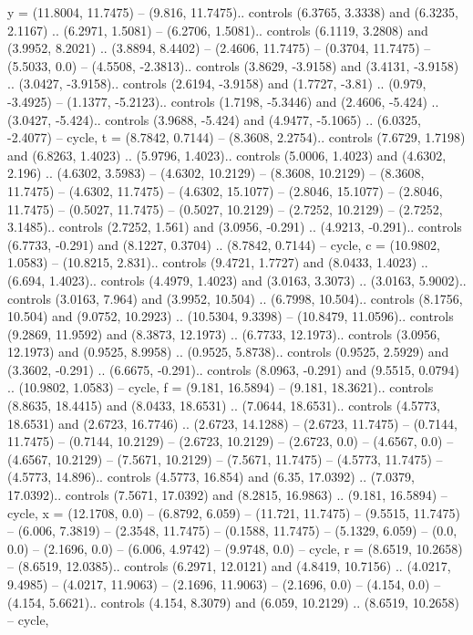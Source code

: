 {y} = {(11.8004, 11.7475) -- (9.816, 11.7475).. controls (6.3765, 3.3338) and (6.3235, 2.1167) .. (6.2971, 1.5081) -- (6.2706, 1.5081).. controls (6.1119, 3.2808) and (3.9952, 8.2021) .. (3.8894, 8.4402) -- (2.4606, 11.7475) -- (0.3704, 11.7475) -- (5.5033, 0.0) -- (4.5508, -2.3813).. controls (3.8629, -3.9158) and (3.4131, -3.9158) .. (3.0427, -3.9158).. controls (2.6194, -3.9158) and (1.7727, -3.81) .. (0.979, -3.4925) -- (1.1377, -5.2123).. controls (1.7198, -5.3446) and (2.4606, -5.424) .. (3.0427, -5.424).. controls (3.9688, -5.424) and (4.9477, -5.1065) .. (6.0325, -2.4077) -- cycle},
{t} = {(8.7842, 0.7144) -- (8.3608, 2.2754).. controls (7.6729, 1.7198) and (6.8263, 1.4023) .. (5.9796, 1.4023).. controls (5.0006, 1.4023) and (4.6302, 2.196) .. (4.6302, 3.5983) -- (4.6302, 10.2129) -- (8.3608, 10.2129) -- (8.3608, 11.7475) -- (4.6302, 11.7475) -- (4.6302, 15.1077) -- (2.8046, 15.1077) -- (2.8046, 11.7475) -- (0.5027, 11.7475) -- (0.5027, 10.2129) -- (2.7252, 10.2129) -- (2.7252, 3.1485).. controls (2.7252, 1.561) and (3.0956, -0.291) .. (4.9213, -0.291).. controls (6.7733, -0.291) and (8.1227, 0.3704) .. (8.7842, 0.7144) -- cycle},
{c} = {(10.9802, 1.0583) -- (10.8215, 2.831).. controls (9.4721, 1.7727) and (8.0433, 1.4023) .. (6.694, 1.4023).. controls (4.4979, 1.4023) and (3.0163, 3.3073) .. (3.0163, 5.9002).. controls (3.0163, 7.964) and (3.9952, 10.504) .. (6.7998, 10.504).. controls (8.1756, 10.504) and (9.0752, 10.2923) .. (10.5304, 9.3398) -- (10.8479, 11.0596).. controls (9.2869, 11.9592) and (8.3873, 12.1973) .. (6.7733, 12.1973).. controls (3.0956, 12.1973) and (0.9525, 8.9958) .. (0.9525, 5.8738).. controls (0.9525, 2.5929) and (3.3602, -0.291) .. (6.6675, -0.291).. controls (8.0963, -0.291) and (9.5515, 0.0794) .. (10.9802, 1.0583) -- cycle},
{f} = {(9.181, 16.5894) -- (9.181, 18.3621).. controls (8.8635, 18.4415) and (8.0433, 18.6531) .. (7.0644, 18.6531).. controls (4.5773, 18.6531) and (2.6723, 16.7746) .. (2.6723, 14.1288) -- (2.6723, 11.7475) -- (0.7144, 11.7475) -- (0.7144, 10.2129) -- (2.6723, 10.2129) -- (2.6723, 0.0) -- (4.6567, 0.0) -- (4.6567, 10.2129) -- (7.5671, 10.2129) -- (7.5671, 11.7475) -- (4.5773, 11.7475) -- (4.5773, 14.896).. controls (4.5773, 16.854) and (6.35, 17.0392) .. (7.0379, 17.0392).. controls (7.5671, 17.0392) and (8.2815, 16.9863) .. (9.181, 16.5894) -- cycle},
{x} = {(12.1708, 0.0) -- (6.8792, 6.059) -- (11.721, 11.7475) -- (9.5515, 11.7475) -- (6.006, 7.3819) -- (2.3548, 11.7475) -- (0.1588, 11.7475) -- (5.1329, 6.059) -- (0.0, 0.0) -- (2.1696, 0.0) -- (6.006, 4.9742) -- (9.9748, 0.0) -- cycle},
{r} = {(8.6519, 10.2658) -- (8.6519, 12.0385).. controls (6.2971, 12.0121) and (4.8419, 10.7156) .. (4.0217, 9.4985) -- (4.0217, 11.9063) -- (2.1696, 11.9063) -- (2.1696, 0.0) -- (4.154, 0.0) -- (4.154, 5.6621).. controls (4.154, 8.3079) and (6.059, 10.2129) .. (8.6519, 10.2658) -- cycle},
